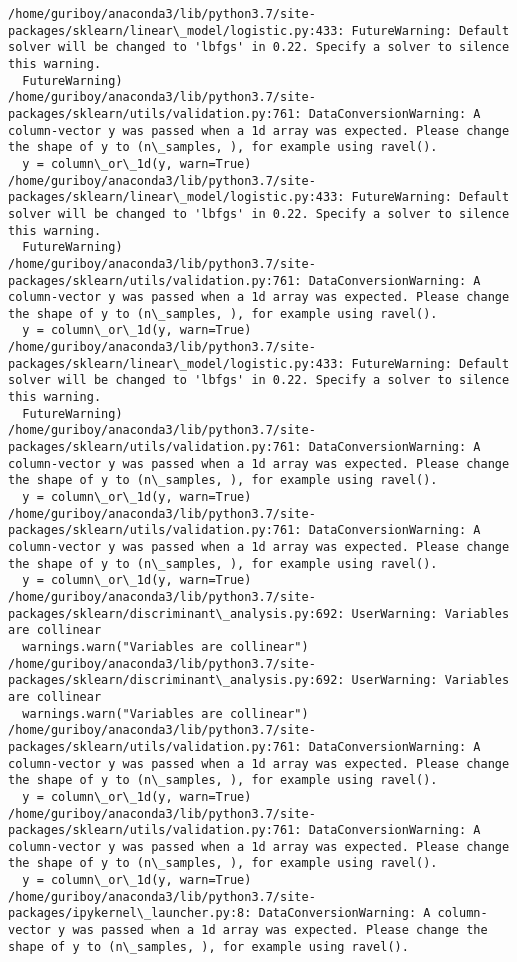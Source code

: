 \documentclass[11pt]{article}
\begin{document}
    \begin{Verbatim}[commandchars=\\\{\}]
/home/guriboy/anaconda3/lib/python3.7/site-packages/sklearn/linear\_model/logistic.py:433: FutureWarning: Default solver will be changed to 'lbfgs' in 0.22. Specify a solver to silence this warning.
  FutureWarning)
/home/guriboy/anaconda3/lib/python3.7/site-packages/sklearn/utils/validation.py:761: DataConversionWarning: A column-vector y was passed when a 1d array was expected. Please change the shape of y to (n\_samples, ), for example using ravel().
  y = column\_or\_1d(y, warn=True)
/home/guriboy/anaconda3/lib/python3.7/site-packages/sklearn/linear\_model/logistic.py:433: FutureWarning: Default solver will be changed to 'lbfgs' in 0.22. Specify a solver to silence this warning.
  FutureWarning)
/home/guriboy/anaconda3/lib/python3.7/site-packages/sklearn/utils/validation.py:761: DataConversionWarning: A column-vector y was passed when a 1d array was expected. Please change the shape of y to (n\_samples, ), for example using ravel().
  y = column\_or\_1d(y, warn=True)
/home/guriboy/anaconda3/lib/python3.7/site-packages/sklearn/linear\_model/logistic.py:433: FutureWarning: Default solver will be changed to 'lbfgs' in 0.22. Specify a solver to silence this warning.
  FutureWarning)
/home/guriboy/anaconda3/lib/python3.7/site-packages/sklearn/utils/validation.py:761: DataConversionWarning: A column-vector y was passed when a 1d array was expected. Please change the shape of y to (n\_samples, ), for example using ravel().
  y = column\_or\_1d(y, warn=True)
/home/guriboy/anaconda3/lib/python3.7/site-packages/sklearn/utils/validation.py:761: DataConversionWarning: A column-vector y was passed when a 1d array was expected. Please change the shape of y to (n\_samples, ), for example using ravel().
  y = column\_or\_1d(y, warn=True)
/home/guriboy/anaconda3/lib/python3.7/site-packages/sklearn/discriminant\_analysis.py:692: UserWarning: Variables are collinear
  warnings.warn("Variables are collinear")
/home/guriboy/anaconda3/lib/python3.7/site-packages/sklearn/discriminant\_analysis.py:692: UserWarning: Variables are collinear
  warnings.warn("Variables are collinear")
/home/guriboy/anaconda3/lib/python3.7/site-packages/sklearn/utils/validation.py:761: DataConversionWarning: A column-vector y was passed when a 1d array was expected. Please change the shape of y to (n\_samples, ), for example using ravel().
  y = column\_or\_1d(y, warn=True)
/home/guriboy/anaconda3/lib/python3.7/site-packages/sklearn/utils/validation.py:761: DataConversionWarning: A column-vector y was passed when a 1d array was expected. Please change the shape of y to (n\_samples, ), for example using ravel().
  y = column\_or\_1d(y, warn=True)
/home/guriboy/anaconda3/lib/python3.7/site-packages/ipykernel\_launcher.py:8: DataConversionWarning: A column-vector y was passed when a 1d array was expected. Please change the shape of y to (n\_samples, ), for example using ravel().
  

    \end{Verbatim}
\end{document}
